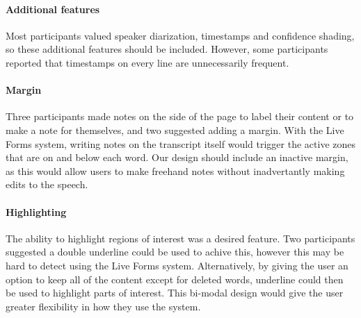 
\paragraph{Additional features}
Most participants valued speaker diarization, timestamps and confidence shading, so these additional features should be
included.  However, some participants reported that timestamps on every line are unnecessarily frequent.

\paragraph{Margin}
Three participants made notes on the side of the page to label their content or to make a note for themselves, and two
suggested adding a margin. With the Live Forms system, writing notes on the transcript itself would trigger the active
zones that are on and below each word. Our design should include an inactive margin, as this would allow users to make
freehand notes without inadvertantly making edits to the speech.

\paragraph{Highlighting}
The ability to highlight regions of interest was a desired feature. Two participants suggested a double underline could
be used to achive this, however this may be hard to detect using the Live Forms system. Alternatively, by giving the
user an option to keep all of the content except for deleted words, underline could then be used to highlight parts of
interest. This bi-modal design would give the user greater flexibility in how they use the system.

